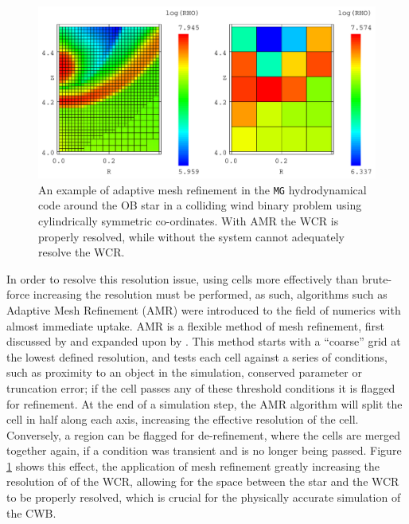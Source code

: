 
\begin{figure}[h]
  \centering
  \includegraphics[width=5in]{assets/mergecellc.pdf}
  \caption[Adaptive mesh refinement comparison]{An example of adaptive mesh refinement in the \texttt{MG} hydrodynamical code around the OB star in a colliding wind binary problem using cylindrically symmetric co-ordinates. With AMR the WCR is properly resolved, while without the system cannot adequately resolve the WCR.}
  \label{fig:mgrefine}
\end{figure}

In order to resolve this resolution issue, using cells more effectively than brute-force increasing the resolution must be performed, as such, algorithms such as Adaptive Mesh Refinement (AMR) were introduced to the field of numerics with almost immediate uptake.
AMR is a flexible method of mesh refinement, first discussed by \textcite{bergerAdaptiveMeshRefinement1984} and expanded upon by \textcite{bergerLocalAdaptiveMesh1989}.
This method starts with a ``coarse'' grid at the lowest defined resolution, and tests each cell against a series of conditions, such as proximity to an object in the simulation, conserved parameter or truncation error; if the cell passes any of these threshold conditions it is flagged for refinement.
At the end of a simulation step, the AMR algorithm will split the cell in half along each axis, increasing the effective resolution of the cell.
Conversely, a region can be flagged for de-refinement, where the cells are merged together again, if a condition was transient and is no longer being passed.
Figure \ref{fig:mgrefine} shows this effect, the application of mesh refinement greatly increasing the resolution of of the WCR, allowing for the space between the star and the WCR to be properly resolved, which is crucial for the physically accurate simulation of the CWB.

